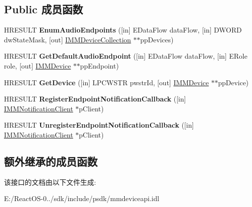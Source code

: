 \subsection*{Public 成员函数}
\begin{DoxyCompactItemize}
\item 
\mbox{\label{interface_i_m_m_device_enumerator_a5d0f3db7235873ef4a9bfe5c633a29a1}} 
H\+R\+E\+S\+U\+LT {\bfseries Enum\+Audio\+Endpoints} (\mbox{[}in\mbox{]} E\+Data\+Flow data\+Flow, \mbox{[}in\mbox{]} D\+W\+O\+RD dw\+State\+Mask, \mbox{[}out\mbox{]} \hyperlink{interface_i_m_m_device_collection}{I\+M\+M\+Device\+Collection} $\ast$$\ast$pp\+Devices)
\item 
\mbox{\label{interface_i_m_m_device_enumerator_a013497f73a5521bd4ebbc464b2a54f25}} 
H\+R\+E\+S\+U\+LT {\bfseries Get\+Default\+Audio\+Endpoint} (\mbox{[}in\mbox{]} E\+Data\+Flow data\+Flow, \mbox{[}in\mbox{]} E\+Role role, \mbox{[}out\mbox{]} \hyperlink{interface_i_m_m_device}{I\+M\+M\+Device} $\ast$$\ast$pp\+Endpoint)
\item 
\mbox{\label{interface_i_m_m_device_enumerator_a3b65191877019e32431fdd7418b63a38}} 
H\+R\+E\+S\+U\+LT {\bfseries Get\+Device} (\mbox{[}in\mbox{]} L\+P\+C\+W\+S\+TR pwstr\+Id, \mbox{[}out\mbox{]} \hyperlink{interface_i_m_m_device}{I\+M\+M\+Device} $\ast$$\ast$pp\+Device)
\item 
\mbox{\label{interface_i_m_m_device_enumerator_aa7aa4f98987d451388e5c99856af9f8c}} 
H\+R\+E\+S\+U\+LT {\bfseries Register\+Endpoint\+Notification\+Callback} (\mbox{[}in\mbox{]} \hyperlink{interface_i_m_m_notification_client}{I\+M\+M\+Notification\+Client} $\ast$p\+Client)
\item 
\mbox{\label{interface_i_m_m_device_enumerator_a873626ff3464d50b0ff066ac9eaa9c81}} 
H\+R\+E\+S\+U\+LT {\bfseries Unregister\+Endpoint\+Notification\+Callback} (\mbox{[}in\mbox{]} \hyperlink{interface_i_m_m_notification_client}{I\+M\+M\+Notification\+Client} $\ast$p\+Client)
\end{DoxyCompactItemize}
\subsection*{额外继承的成员函数}


该接口的文档由以下文件生成\+:\begin{DoxyCompactItemize}
\item 
E\+:/\+React\+O\+S-\/0../sdk/include/psdk/mmdeviceapi.\+idl\end{DoxyCompactItemize}
